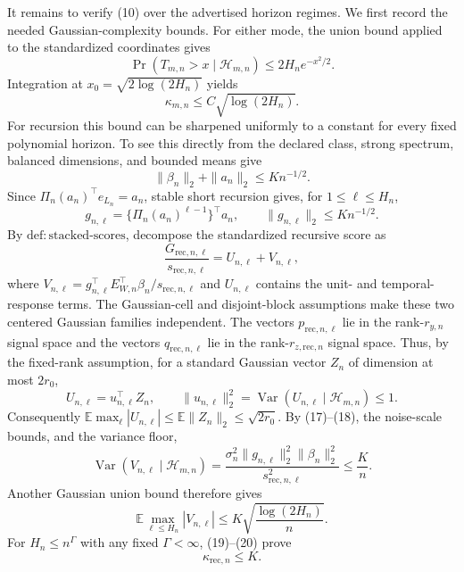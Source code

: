 It remains to verify (10) over the advertised horizon regimes.  We first record the needed Gaussian-complexity bounds.  For either mode, the union bound applied to the standardized coordinates gives
\[
 \Pr(T_{m,n}>x\mid\mathcal H_{m,n})\le2H_ne^{-x^2/2}.
\]
Integration at \(x_0=\sqrt{2\log(2H_n)}\) yields
\[
 \kappa_{m,n}\le C\sqrt{\log(2H_n)}.                               \tag{16}
\]
For recursion this bound can be sharpened uniformly to a constant for every fixed polynomial horizon.  To see this directly from the declared class, strong spectrum, balanced dimensions, and bounded means give
\[
 \|\beta_n\|_2+\|a_n\|_2\le K n^{-1/2}.                            \tag{17}
\]
Since \(\Pi_n(a_n)^{\top}e_{L_n}=a_n\), stable short recursion gives, for \(1\le\ell\le H_n\),
\[
 g_{n,\ell}=\{\Pi_n(a_n)^{\ell-1}\}^{\top}a_n,
 \qquad \|g_{n,\ell}\|_2\le K n^{-1/2}.                           \tag{18}
\]
By \(\mathrm{def{:}stacked\mbox{-}scores}\), decompose the standardized recursive score as
\[
 \frac{G_{\mathrm{rec},n,\ell}}{s_{\mathrm{rec},n,\ell}}
 =U_{n,\ell}+V_{n,\ell},
\]
where \(V_{n,\ell}=g_{n,\ell}^{\top}E_{W,n}^{\top}\beta_n/s_{\mathrm{rec},n,\ell}\) and \(U_{n,\ell}\) contains the unit- and temporal-response terms.  The Gaussian-cell and disjoint-block assumptions make these two centered Gaussian families independent.  The vectors \(p_{\mathrm{rec},n,\ell}\) lie in the rank-\(r_{y,n}\) signal space and the vectors \(q_{\mathrm{rec},n,\ell}\) lie in the rank-\(r_{z,\mathrm{rec},n}\) signal space.  Thus, by the fixed-rank assumption, for a standard Gaussian vector \(Z_n\) of dimension at most \(2r_0\),
\[
 U_{n,\ell}=u_{n,\ell}^{\top}Z_n,
 \qquad \|u_{n,\ell}\|_2^2=\operatorname{Var}(U_{n,\ell}\mid\mathcal H_{m,n})\le1. \tag{19}
\]
Consequently \(\mathbb E\max_\ell|U_{n,\ell}|\le\mathbb E\|Z_n\|_2\le\sqrt{2r_0}\).  By (17)--(18), the noise-scale bounds, and the variance floor,
\[
 \operatorname{Var}(V_{n,\ell}\mid\mathcal H_{m,n})
 =\frac{\sigma_n^2\|g_{n,\ell}\|_2^2\|\beta_n\|_2^2}
 {s_{\mathrm{rec},n,\ell}^2}
 \le \frac K n.                                                     \tag{20}
\]
Another Gaussian union bound therefore gives
\[
 \mathbb E\max_{\ell\le H_n}|V_{n,\ell}|
 \le K\sqrt{\frac{\log(2H_n)}n}.
\]
For \(H_n\le n^\Gamma\) with any fixed \(\Gamma<\infty\), (19)--(20) prove
\[
 \kappa_{\mathrm{rec},n}\le K.                                     \tag{21}
\]

